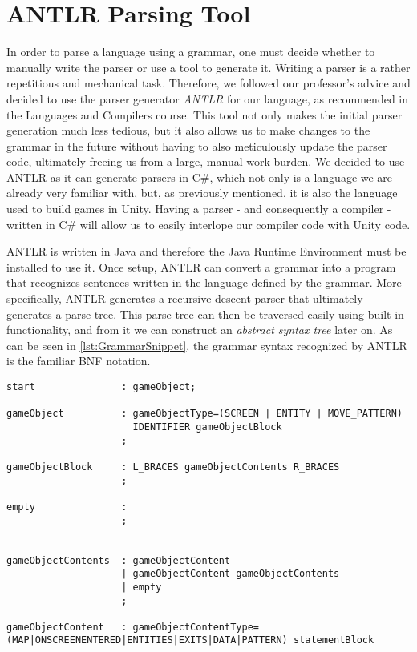 \section{ANTLR Parsing Tool}\label{sec:ANTLRTool}
In order to parse a language using a grammar, one must decide whether to manually write the parser or use a tool to generate it\cite{crafting_a_compiler}.
Writing a parser is a rather repetitious and mechanical task. Therefore, we followed our professor's advice and decided to use the parser generator \textit{ANTLR} for our language, as recommended in the Languages and Compilers course. 
This tool not only makes the initial parser generation much less tedious, but it also allows us to make changes to the grammar in the future without having to also meticulously update the parser code, ultimately freeing us from a large, manual work burden.
We decided to use ANTLR as it can generate parsers in C\#, which not only is a language we are already very familiar with, but, as previously mentioned, it is also the language used to build games in Unity. Having a parser - and consequently a compiler - written in C\# will allow us to easily interlope our compiler code with Unity code.


ANTLR is written in Java and therefore the Java Runtime Environment must be installed to use it. 
Once setup, ANTLR can convert a grammar into a program that recognizes sentences written in the language defined by the grammar.
More specifically, ANTLR generates a recursive-descent parser that ultimately generates a parse tree.
This parse tree can then be traversed easily using built-in functionality, and from it we can construct an \textit{abstract syntax tree} later on.
As can be seen in \ref{lst:GrammarSnippet}, the grammar syntax recognized by ANTLR is the familiar BNF notation.


\begin{lstlisting}[caption={A snippet of the \dazel{} grammar used by ANTLR to generate the parser}, label={lst:GrammarSnippet}]
start				: gameObject;

gameObject          : gameObjectType=(SCREEN | ENTITY | MOVE_PATTERN) 
					  IDENTIFIER gameObjectBlock
					;
						
gameObjectBlock     : L_BRACES gameObjectContents R_BRACES
					;

empty               : 
					;


gameObjectContents  : gameObjectContent
					| gameObjectContent gameObjectContents
					| empty
					;

gameObjectContent   : gameObjectContentType=(MAP|ONSCREENENTERED|ENTITIES|EXITS|DATA|PATTERN) statementBlock 
\end{lstlisting}

